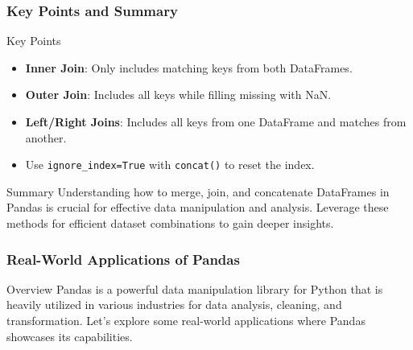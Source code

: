 \documentclass[aspectratio=169]{beamer}
\begin{document}
\begin{frame}[fragile]
    \frametitle{Key Points and Summary}
    \begin{block}{Key Points}
        \begin{itemize}
            \item \textbf{Inner Join}: Only includes matching keys from both DataFrames.
            \item \textbf{Outer Join}: Includes all keys while filling missing with NaN.
            \item \textbf{Left/Right Joins}: Includes all keys from one DataFrame and matches from another.
            \item Use \texttt{ignore\_index=True} with \texttt{concat()} to reset the index.
        \end{itemize}
    \end{block}

    \begin{block}{Summary}
        Understanding how to merge, join, and concatenate DataFrames in Pandas is crucial for effective data manipulation and analysis.
        Leverage these methods for efficient dataset combinations to gain deeper insights.
    \end{block}
\end{frame}

\begin{frame}
    \frametitle{Real-World Applications of Pandas}
    \begin{block}{Overview}
        Pandas is a powerful data manipulation library for Python that is heavily utilized in various industries for data analysis, cleaning, and transformation.
        Let's explore some real-world applications where Pandas showcases its capabilities.
    \end{block}
\end{frame}
\end{document}
